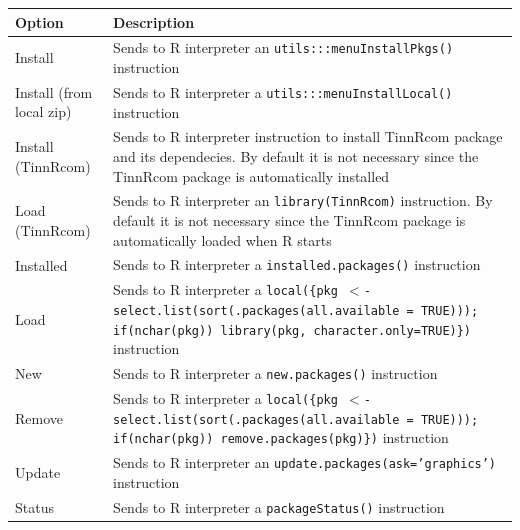 \begin{scriptsize}
  \begin{tabularx}{\headwidth}{>{\hsize=0.2\hsize}X>{\hsize=0.7\hsize}X}\\
    \hline
    \textbf{Option} & \textbf{Description} \\
    \hline
    Install & Sends to R interpreter an \texttt{utils:::menuInstallPkgs()} instruction \\
    Install (from local zip) & Sends to R interpreter a \texttt{utils:::menuInstallLocal()} instruction \\
    Install (TinnRcom) & Sends to R interpreter instruction to install TinnRcom package and its dependecies.
      By default it is not necessary since the TinnRcom package is automatically installed \\
    Load (TinnRcom) & Sends to R interpreter an \texttt{library(TinnRcom)} instruction.
      By default it is not necessary since the TinnRcom package is automatically loaded when R starts \\
    Installed & Sends to R interpreter a \texttt{installed.packages()} instruction \\
    Load & Sends to R interpreter a \texttt{local(\{pkg $<$- select.list(sort(.packages(all.available = TRUE))); if(nchar(pkg)) library(pkg, character.only=TRUE)\})} instruction \\
    New & Sends to R interpreter a \texttt{new.packages()} instruction \\
    Remove & Sends to R interpreter a \texttt{local(\{pkg $<$- select.list(sort(.packages(all.available = TRUE))); if(nchar(pkg)) remove.packages(pkg)\})} instruction \\
    Update & Sends to R interpreter an \texttt{update.packages(ask='graphics')} instruction \\
    Status & Sends to R interpreter a \texttt{packageStatus()} instruction \\
    \hline
  \end{tabularx}
\end{scriptsize}
